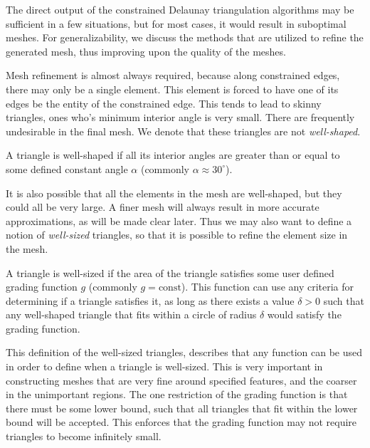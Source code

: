 \documentclass[../fem.tex]{subfile}
\begin{document}
The direct output of the constrained Delaunay triangulation algorithms may be
sufficient in a few situations, but for most cases, it would result in
suboptimal meshes. For generalizability, we discuss the methods that are utilized
to refine the generated mesh, thus improving upon the quality of the meshes.

Mesh refinement is almost always required, because along constrained edges,
there may only be a single element. This element is forced to have one of its
edges be the entity of the constrained edge. This tends to lead to skinny
triangles, ones who's minimum interior angle is very small. There are frequently
undesirable in the final mesh. We denote that these triangles are not
\textit{well-shaped}.

\begin{definition} \label{def:well_shaped}
  A triangle is well-shaped if all its interior angles are greater than or
  equal to some defined constant angle $\alpha$ (commonly
  $\alpha\approx30^\circ$).
\end{definition}

It is also possible that all the elements in the mesh are well-shaped, but they
could all be very large. A finer mesh will always result in more accurate
approximations, as will be made clear later. Thus we may also want to define a
notion of \textit{well-sized} triangles, so that it is possible to refine the
element size in the mesh.

\begin{definition} \label{def:well_sized}
  A triangle is well-sized if the area of the triangle satisfies some user
  defined grading function $g$ (commonly $g=\text{const}$). This function can
  use any criteria for determining if a triangle satisfies it, as long as there
  exists a value $\delta>0$ such that any well-shaped triangle that fits within
  a circle of radius $\delta$ would satisfy the grading function.
\end{definition}

This definition of the well-sized triangles, describes that any function can be
used in order to define when a triangle is well-sized. This is very important
in constructing meshes that are very fine around specified features, and the
coarser in the unimportant regions. The one restriction of the grading function
is that there must be some lower bound, such that all triangles that fit within
the lower bound will be accepted. This enforces that the grading function may
not require triangles to become infinitely small.
\end{document}
